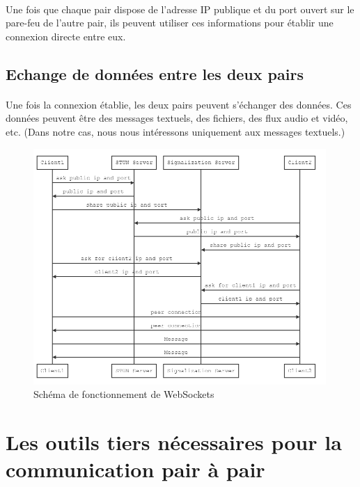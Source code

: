 \paragraph{}
Une fois que chaque pair dispose de l'adresse IP publique et du port ouvert sur le pare-feu de l'autre pair, ils peuvent utiliser ces informations pour établir une connexion directe entre eux. 

\subsection{Echange de données entre les deux pairs}

\paragraph{}
Une fois la connexion établie, les deux pairs peuvent s'échanger des données. Ces données peuvent être des messages textuels, des fichiers, des flux audio et vidéo, etc.
(Dans notre cas, nous nous intéressons uniquement aux messages textuels.)

\begin{figure}[h]
    \centering
    \includegraphics[width=0.99\textwidth]{assets/socket_connection.png}
    \caption{Schéma de fonctionnement de WebSockets}
    \label{fig:websockets}
\end{figure}


\section{Les outils tiers nécessaires pour la communication pair à pair}

